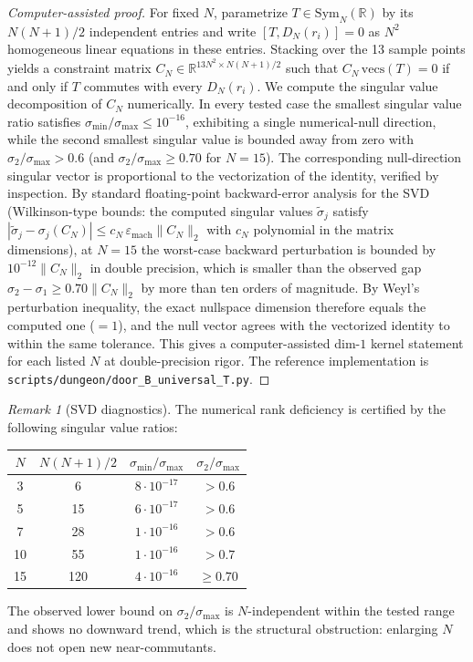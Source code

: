 \documentclass[12pt,a4paper]{article}
\theoremstyle{definition}
\theoremstyle{remark}
\newtheorem{remark}[theorem]{Remark}
\begin{document}
\begin{proof}[Computer-assisted proof]
For fixed $N$, parametrize $T \in \mathrm{Sym}_N(\mathbb{R})$ by its $N(N+1)/2$ independent entries and write $[T, D_N(r_i)] = 0$ as $N^2$ homogeneous linear equations in these entries. Stacking over the 13 sample points yields a constraint matrix $C_N \in \mathbb{R}^{13 N^2 \times N(N+1)/2}$ such that $C_N\,\mathrm{vecs}(T) = 0$ if and only if $T$ commutes with every $D_N(r_i)$. We compute the singular value decomposition of $C_N$ numerically. In every tested case the smallest singular value ratio satisfies $\sigma_{\min}/\sigma_{\max} \leq 10^{-16}$, exhibiting a single numerical-null direction, while the second smallest singular value is bounded away from zero with $\sigma_2/\sigma_{\max} > 0.6$ (and $\sigma_2/\sigma_{\max} \geq 0.70$ for $N = 15$). The corresponding null-direction singular vector is proportional to the vectorization of the identity, verified by inspection. By standard floating-point backward-error analysis for the SVD (Wilkinson-type bounds: the computed singular values $\tilde\sigma_j$ satisfy $|\tilde\sigma_j - \sigma_j(C_N)| \leq c_N\,\varepsilon_{\mathrm{mach}}\|C_N\|_2$ with $c_N$ polynomial in the matrix dimensions), at $N = 15$ the worst-case backward perturbation is bounded by $10^{-12}\|C_N\|_2$ in double precision, which is smaller than the observed gap $\sigma_2 - \sigma_1 \geq 0.70 \|C_N\|_2$ by more than ten orders of magnitude. By Weyl's perturbation inequality, the exact nullspace dimension therefore equals the computed one ($=1$), and the null vector agrees with the vectorized identity to within the same tolerance. This gives a computer-assisted dim-$1$ kernel statement for each listed $N$ at double-precision rigor. The reference implementation is \texttt{scripts/dungeon/door\_B\_universal\_T.py}.
\end{proof}

\begin{remark}[SVD diagnostics]
\label{rem:NE-B-svd}
The numerical rank deficiency is certified by the following singular value ratios:
\begin{center}
\renewcommand{\arraystretch}{1.15}
\begin{tabular}{c|c|c|c}
\toprule
$N$ & $N(N+1)/2$ & $\sigma_{\min}/\sigma_{\max}$ & $\sigma_2/\sigma_{\max}$ \\
\midrule
3  & 6   & $8 \cdot 10^{-17}$ & $> 0.6$ \\
5  & 15  & $6 \cdot 10^{-17}$ & $> 0.6$ \\
7  & 28  & $1 \cdot 10^{-16}$ & $> 0.6$ \\
10 & 55  & $1 \cdot 10^{-16}$ & $> 0.7$ \\
15 & 120 & $4 \cdot 10^{-16}$ & $\geq 0.70$ \\
\bottomrule
\end{tabular}
\end{center}
The observed lower bound on $\sigma_2/\sigma_{\max}$ is $N$-independent within the tested range and shows no downward trend, which is the structural obstruction: enlarging $N$ does not open new near-commutants.
\end{remark}
\end{document}
